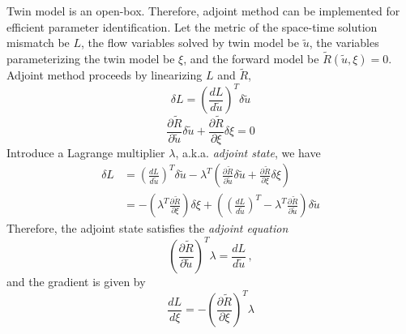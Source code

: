 \documentclass[a4paper,onecolumn]{article}
\theoremstyle{remark}
\begin{document}
\noindent Twin model is an open-box. Therefore, adjoint method 
can be implemented for efficient parameter identification.
Let the metric of the space-time solution mismatch be $L$,
the flow variables solved by twin model be $\tilde{u}$,
the variables parameterizing the twin model be $\xi$,
and the forward model be $\tilde{R}(\tilde{u},\xi) = 0$.
Adjoint method proceeds by linearizing $L$ and $\tilde{R}$,
\begin{equation}
    \delta L = \left(\frac{d L}{d \tilde{u}}\right)^T \delta \tilde{u}
\end{equation}
\begin{equation}
    \frac{\partial \tilde{R}}{\partial \tilde{u}} \delta \tilde{u}
    + \frac{\partial \tilde{R}}{\partial \xi} \delta \xi = 0
\end{equation}
Introduce a Lagrange multiplier $\lambda$, a.k.a. \emph{adjoint state}, we have
\begin{equation}\begin{split}
    \delta L &= \left(\frac{d L}{d \tilde{u}}\right)^T \delta \tilde{u}
    - \lambda^T \left(\frac{\partial \tilde{R}}{\partial \tilde{u}} \delta \tilde{u}
    + \frac{\partial \tilde{R}}{\partial \xi}\delta \xi\right)\\
    &= -\left( \lambda^T \frac{\partial \tilde{R}}{\partial \xi}\right) \delta \xi
    + \left( \left(\frac{d L}{d \tilde{u}}\right)^T 
        - \lambda^T \frac{\partial \tilde{R}}{\partial \tilde{u}}
    \right)\delta \tilde{u}
\end{split}\end{equation}
Therefore, the adjoint state satisfies the \emph{adjoint equation}
\begin{equation}
    \left(\frac{\partial \tilde{R}}{\partial \tilde{u}}\right)^T \lambda = \frac{d L}{d\tilde{u}}\,,
\end{equation}
and the gradient is given by
\begin{equation}
    \frac{dL}{d \xi} = -
    \left(\frac{\partial \tilde{R}}{\partial \xi}\right)^T \lambda
\end{equation}
\end{document}
